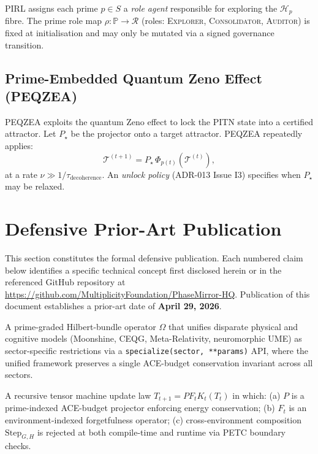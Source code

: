 \documentclass[12pt,a4paper]{article}
\theoremstyle{definition}
\theoremstyle{plain}
\theoremstyle{remark}
\begin{document}
PIRL assigns each prime $p \in S$ a \emph{role agent} responsible for
exploring the $\mathcal{H}_p$ fibre. The prime role map
$\rho : \mathbb{P} \to \mathcal{R}$ (roles: \textsc{Explorer},
\textsc{Consolidator}, \textsc{Auditor}) is fixed at initialisation and may
only be mutated via a signed governance transition.

\subsection{Prime-Embedded Quantum Zeno Effect (PEQZEA)}

PEQZEA exploits the quantum Zeno effect to lock the PITN state into a
certified attractor. Let $P_\star$ be the projector onto a target attractor.
PEQZEA repeatedly applies:
\begin{equation}
  \mathcal{T}^{(t+1)} = P_\star\,\Phi_{p(t)}(\mathcal{T}^{(t)}),
\end{equation}
at a rate $\nu \gg 1/\tau_{\mathrm{decoherence}}$. An \emph{unlock policy}
(ADR-013 Issue I3) specifies when $P_\star$ may be relaxed.

\newpage

\section{Defensive Prior-Art Publication}
\label{sec:priorart}

This section constitutes the formal defensive publication. Each numbered claim
below identifies a specific technical concept first disclosed herein or in the
referenced GitHub repository at
\url{https://github.com/MultiplicityFoundation/PhaseMirror-HQ}.
Publication of this document establishes a prior-art date of
\textbf{April 29, 2026}.

\begin{claimbox}[title={Claim 1 --- Core Multiplicity Operator $\Omega$}]
A prime-graded Hilbert-bundle operator $\Omega$ that unifies disparate physical
and cognitive models (Moonshine, CEQG, Meta-Relativity, neuromorphic UME) as
sector-specific restrictions via a \texttt{specialize(sector, **params)} API,
where the unified framework preserves a single ACE-budget conservation invariant
across all sectors.
\end{claimbox}

\begin{claimbox}[title={Claim 2 --- PIRTM v2 Update Law with PETC Boundary}]
A recursive tensor machine update law $T_{t+1} = P F_t K_t(T_t)$ in which:
(a) $P$ is a prime-indexed ACE-budget projector enforcing energy conservation;
(b) $F_t$ is an environment-indexed forgetfulness operator;
(c) cross-environment composition $\mathrm{Step}_{G,H}$ is rejected at both
compile-time and runtime via PETC boundary checks.
\end{claimbox}
\end{document}
